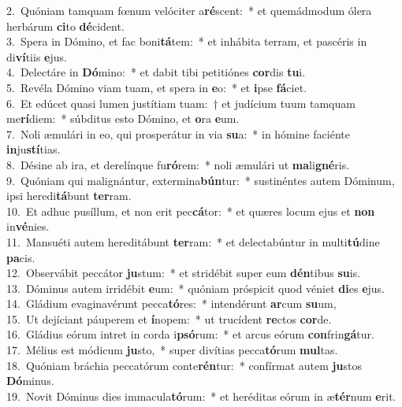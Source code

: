 {2.~}Quóniam tamquam fœnum velóciter a\textbf{ré}scent:~* et quemádmodum ólera herbárum \textbf{ci}to \textbf{dé}cident.\\
{3.~}Spera in Dómino, et fac boni\textbf{tá}tem:~* et inhábita terram, et pascéris in di\textbf{ví}tiis \textbf{e}jus.\\
{4.~}Delectáre in \textbf{Dó}mino:~* et dabit tibi petitiónes \textbf{cor}dis \textbf{tu}i.\\
{5.~}Revéla Dómino viam tuam, et spera in \textbf{e}o:~* et \textbf{i}pse \textbf{fá}ciet.\\
{6.~}Et edúcet quasi lumen justítiam tuam:~† et judícium tuum tamquam me\textbf{rí}diem:~* súbditus esto Dómino, et \textbf{o}ra \textbf{e}um.\\
{7.~}Noli æmulári in eo, qui prosperátur in via \textbf{su}a:~* in hómine faciénte \textbf{in}ju\textbf{stí}tias.\\
{8.~}Désine ab ira, et derelínque fu\textbf{ró}rem:~* noli æmulári ut \textbf{ma}li\textbf{gné}ris.\\
{9.~}Quóniam qui malignántur, extermina\textbf{bún}tur:~* sustinéntes autem Dóminum, ipsi heredi\textbf{tá}bunt \textbf{ter}ram.\\
{10.~}Et adhuc pusíllum, et non erit pec\textbf{cá}tor:~* et quæres locum ejus et \textbf{non} in\textbf{vé}nies.\\
{11.~}Mansuéti autem hereditábunt \textbf{ter}ram:~* et delectabúntur in multi\textbf{tú}dine \textbf{pa}cis.\\
{12.~}Observábit peccátor \textbf{ju}stum:~* et stridébit super eum \textbf{dén}tibus \textbf{su}is.\\
{13.~}Dóminus autem irridébit \textbf{e}um:~* quóniam próspicit quod véniet \textbf{di}es \textbf{e}jus.\\
{14.~}Gládium evaginavérunt pecca\textbf{tó}res:~* intendérunt \textbf{ar}cum \textbf{su}um,\\
{15.~}Ut dejíciant páuperem et \textbf{í}nopem:~* ut trucídent \textbf{re}ctos \textbf{cor}de.\\
{16.~}Gládius eórum intret in corda i\textbf{psó}rum:~* et arcus eórum \textbf{con}frin\textbf{gá}tur.\\
{17.~}Mélius est módicum \textbf{ju}sto,~* super divítias pecca\textbf{tó}rum \textbf{mul}tas.\\
{18.~}Quóniam bráchia peccatórum conte\textbf{rén}tur:~* confírmat autem \textbf{ju}stos \textbf{Dó}minus.\\
{19.~}Novit Dóminus dies immacula\textbf{tó}rum:~* et heréditas eórum in æ\textbf{tér}num \textbf{e}rit.\\
